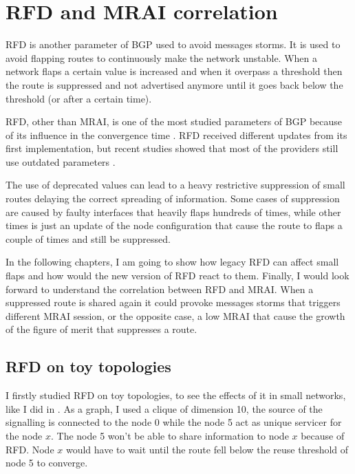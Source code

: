 \chapter{RFD and MRAI correlation}
\label{cha:bgp_rfd}


\ac{RFD} is another parameter of \ac{BGP} used to avoid messages storms.
It is used to avoid flapping routes to continuously make the network unstable.
When a network flaps a certain value is increased and when it overpass a threshold
then the route is suppressed and not advertised anymore until it goes back
below the threshold (or after a certain time).

\ac{RFD}, other than \ac{MRAI}, is one of the most studied parameters of \ac{BGP}
because of its influence in the convergence time \cite{mao2002route,pelsser2011route}.
\ac{RFD} received different updates from its first implementation, but recent 
studies showed that most of the providers still use outdated parameters \cite{gray2020bgp}.

The use of deprecated values can lead to a heavy restrictive suppression
of small routes delaying the correct spreading of information.
Some cases of suppression are caused by faulty interfaces that heavily flaps hundreds of times, 
while other times is just an update of the node configuration that
cause the route to flaps a couple of times and still be suppressed.

In the following chapters, I am going to show how legacy \ac{RFD} can affect 
small flaps and how would the new version of \ac{RFD} react to them.
Finally, I would look forward to understand the correlation between \ac{RFD}
and \ac{MRAI}.
When a suppressed route is shared again it could provoke messages storms that
triggers different \ac{MRAI} session, or the opposite case, a low \ac{MRAI} that
cause the growth of the figure of merit that suppresses a route.

\section{RFD on toy topologies}
\label{sec:bgp_rfd_toy}

I firstly studied \ac{RFD} on toy topologies, to see the effects of it in small 
networks, like I did in .
As a graph, I used a clique of dimension \num{10}, the source of the signalling
is connected to the node \num{0} while the node \num{5} act as unique servicer
for the node $x$.
The node \num{5} won't be able to share information to node $x$ because of \ac{RFD}.
Node $x$ would have to wait until the route fell below the reuse threshold of 
node \num{5} to converge.

